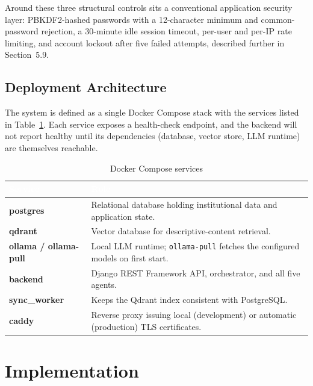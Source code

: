 \documentclass[11pt,a4paper,oneside]{report}
\begin{document}
Around these three structural controls sits a conventional application
security layer: PBKDF2-hashed passwords with a 12-character minimum and
common-password rejection, a 30-minute idle session timeout, per-user and
per-IP rate limiting, and account lockout after five failed attempts,
described further in Section~5.9.

\section{Deployment Architecture}

The system is defined as a single Docker Compose stack with the services
listed in Table~\ref{tab:services}. Each service exposes a health-check
endpoint, and the backend will not report healthy until its dependencies
(database, vector store, LLM runtime) are themselves reachable.

\begin{table}[h]
\centering
\caption{Docker Compose services}
\label{tab:services}
\renewcommand{\arraystretch}{1.3}
\begin{tabularx}{\linewidth}{|>{\bfseries}p{2.6cm}|X|}
\hline
\rowcolor{hdrnavy}
\textcolor{white}{Service} & \textcolor{white}{Role} \\
\hline
postgres & Relational database holding institutional data and application
  state. \\
\hline
qdrant & Vector database for descriptive-content retrieval. \\
\hline
ollama / ollama-pull & Local LLM runtime; \texttt{ollama-pull} fetches the
  configured models on first start. \\
\hline
backend & Django REST Framework API, orchestrator, and all five agents. \\
\hline
sync\_worker & Keeps the Qdrant index consistent with PostgreSQL. \\
\hline
caddy & Reverse proxy issuing local (development) or automatic
  (production) TLS certificates. \\
\hline
\end{tabularx}
\end{table}

\chapter{Implementation}
\end{document}

